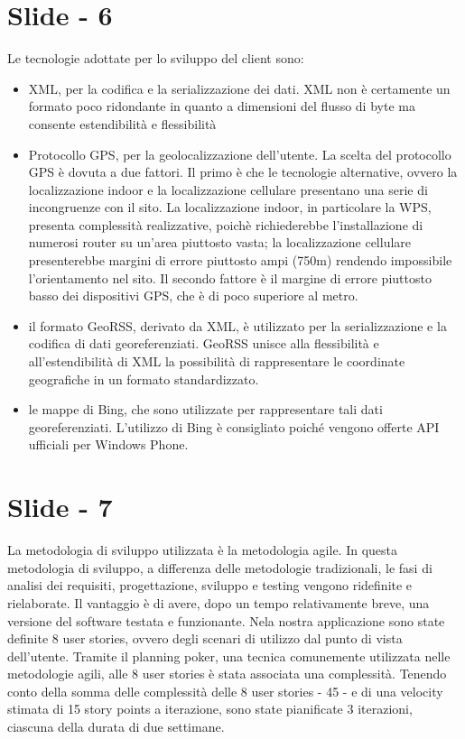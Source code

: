 \documentclass[12pt]{article}
\begin{document}
\section{Slide - 6}
Le tecnologie adottate per lo sviluppo del client sono:
\begin{itemize}
\item XML, per la codifica e la serializzazione dei dati. XML non è certamente un formato poco ridondante in quanto a dimensioni del flusso di byte ma consente estendibilità e flessibilità
\item Protocollo GPS, per la geolocalizzazione dell'utente. La scelta del protocollo GPS è dovuta a due fattori. Il primo è che le tecnologie alternative, ovvero la localizzazione indoor e la localizzazione cellulare presentano una serie di incongruenze con il sito. La localizzazione indoor, in particolare la WPS, presenta complessità realizzative, poichè richiederebbe l'installazione di numerosi router su un'area piuttosto vasta; la localizzazione cellulare presenterebbe margini di errore piuttosto ampi (750m) rendendo impossibile l'orientamento nel sito.
Il secondo fattore è il margine di errore piuttosto basso dei dispositivi GPS, che è di poco superiore al metro.
\item il formato GeoRSS, derivato da XML, è utilizzato per la serializzazione e la codifica di dati georeferenziati. GeoRSS unisce alla flessibilità e all'estendibilità di XML la possibilità di rappresentare le coordinate geografiche in un formato standardizzato.
\item le mappe di Bing, che sono utilizzate per rappresentare tali dati georeferenziati. L'utilizzo di Bing è consigliato poiché vengono offerte API ufficiali per Windows Phone.
\end{itemize}

\section{Slide - 7}
La metodologia di sviluppo utilizzata è la metodologia agile.
In questa metodologia di sviluppo, a differenza delle metodologie tradizionali, le fasi di analisi dei requisiti, progettazione, sviluppo e testing vengono ridefinite e rielaborate. Il vantaggio è di avere, dopo un tempo relativamente breve, una versione del software testata e funzionante.
Nela nostra applicazione sono state definite 8 user stories, ovvero degli scenari di utilizzo dal punto di vista dell'utente.
Tramite il planning poker, una tecnica comunemente utilizzata nelle metodologie agili, alle 8 user stories è stata associata una complessità. Tenendo conto della somma delle complessità delle 8 user stories - 45 - e di una velocity stimata di 15 story points a iterazione, sono state pianificate 3 iterazioni, ciascuna della durata di due settimane.
\end{document}
